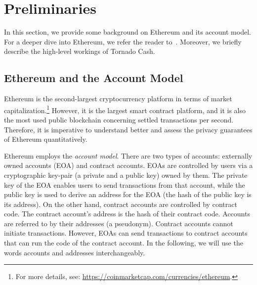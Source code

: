 \section{Preliminaries} \label{sec:preliminaries}
In this section, we provide some background on Ethereum and its account model. For a deeper dive into Ethereum, we refer the reader to~\cite{antonopoulos2018mastering}. Moreover, we briefly describe the high-level workings of Tornado Cash.

\subsection{Ethereum and the Account Model}
Ethereum is the second-largest cryptocurrency platform in terms of market capitalization.\footnote{For more details, see: \url{https://coinmarketcap.com/currencies/ethereum}.} However, it is the largest smart contract platform, and it is also the most used public blockchain concerning settled transactions per second. Therefore, it is imperative to understand better and assess the privacy guarantees of Ethereum quantitatively.

Ethereum employs the \textit{account model}. There are two types of accounts: externally owned accounts (EOA) and contract accounts. EOAs are controlled by users via a cryptographic key-pair (a private and a public key) owned by them. The private key of the EOA enables users to send transactions from that account, while the public key is used to derive an address for the EOA (the hash of the public key is its address). On the other hand, contract accounts are controlled by contract code. The contract account's address is the hash of their contract code. Accounts are referred to by their addresses (a pseudonym). Contract accounts cannot initiate transactions. However, EOAs can send transactions to contract accounts that can run the code of the contract account. In the following, we will use the words accounts and addresses interchangeably. 


